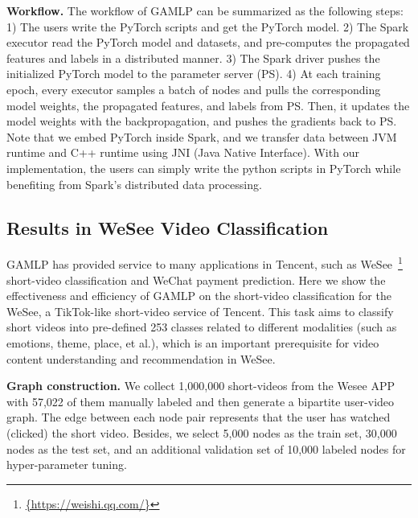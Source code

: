 \documentclass[sigconf]{acmart}
\newcommand{\sys}{\textsc{GAMLP}\xspace}
\newcommand{\blue}[1]{\textcolor{blue}{#1}}
\begin{document}
\noindent\textbf{Workflow.}
The workflow of \sys can be summarized as the following steps: 1) The users write the PyTorch scripts and get the PyTorch model. 2) The Spark executor read the PyTorch model and datasets, and pre-computes the propagated features and labels in a distributed manner. 3) The Spark driver pushes the initialized PyTorch model to the parameter server (PS). 4) At each training epoch, every executor samples a batch of nodes and pulls the corresponding model weights, the propagated features, and labels from PS. Then, it updates the model weights with the backpropagation, and pushes the gradients back to PS. Note that we embed PyTorch inside Spark, and we transfer data between JVM runtime and C++
runtime using JNI (Java Native Interface). With our implementation, the users can simply write the python scripts in PyTorch while benefiting from Spark's distributed data processing. 



\subsection{Results in WeSee Video Classification}
\sys has provided service to many applications in Tencent, such as WeSee~\footnote{\blue{\url{{https://weishi.qq.com/}}}} short-video classification and WeChat payment prediction. Here we show the effectiveness and efficiency of \sys on the short-video classification for the WeSee, a TikTok-like short-video service of Tencent. 
This task aims to classify short videos into pre-defined 253 classes related to different modalities (such as emotions, theme, place, et al.), which is an important prerequisite for video content understanding and recommendation in WeSee.

\noindent\textbf{Graph construction.} We collect 1,000,000 short-videos from the Wesee APP with 57,022 of them manually labeled and then generate a bipartite user-video graph. 
The edge between each node pair represents that the user has watched (clicked) the short video. 
Besides, we select 5,000 nodes as the train set, 30,000 nodes as the test set, and an additional validation set of 10,000 labeled nodes for hyper-parameter tuning.
\end{document}
